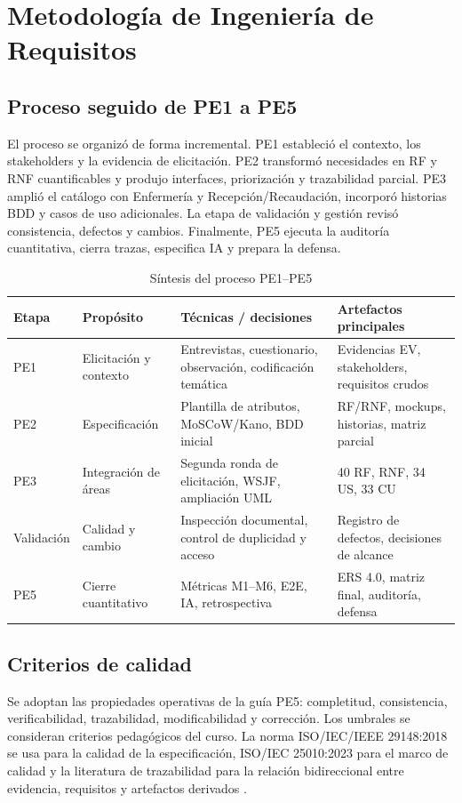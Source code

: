 \documentclass[11pt,a4paper]{article}
\begin{document}
	\section{Metodología de Ingeniería de Requisitos}
	\subsection{Proceso seguido de PE1 a PE5}
	El proceso se organizó de forma incremental. PE1 estableció el contexto, los stakeholders y la evidencia de elicitación. PE2 transformó necesidades en RF y RNF cuantificables y produjo interfaces, priorización y trazabilidad parcial. PE3 amplió el catálogo con Enfermería y Recepción/Recaudación, incorporó historias BDD y casos de uso adicionales. La etapa de validación y gestión revisó consistencia, defectos y cambios. Finalmente, PE5 ejecuta la auditoría cuantitativa, cierra trazas, especifica IA y prepara la defensa.
	
	\begin{table}[H]\centering\caption{Síntesis del proceso PE1--PE5}\label{tab:proceso}
		\begin{tabularx}{\textwidth}{p{1.2cm}p{3cm}Y Y}\toprule
			\textbf{Etapa}&\textbf{Propósito}&\textbf{Técnicas / decisiones}&\textbf{Artefactos principales}\\\midrule
			PE1&Elicitación y contexto&Entrevistas, cuestionario, observación, codificación temática&Evidencias EV, stakeholders, requisitos crudos\\
			PE2&Especificación&Plantilla de atributos, MoSCoW/Kano, BDD inicial&RF/RNF, mockups, historias, matriz parcial\\
			PE3&Integración de áreas&Segunda ronda de elicitación, WSJF, ampliación UML&40 RF, RNF, 34 US, 33 CU\\
			Validación&Calidad y cambio&Inspección documental, control de duplicidad y acceso&Registro de defectos, decisiones de alcance\\
			PE5&Cierre cuantitativo&Métricas M1--M6, E2E, IA, retrospectiva&ERS 4.0, matriz final, auditoría, defensa\\\bottomrule
	\end{tabularx}\end{table}
	
	\subsection{Criterios de calidad}
	Se adoptan las propiedades operativas de la guía PE5: completitud, consistencia, verificabilidad, trazabilidad, modificabilidad y corrección. Los umbrales se consideran criterios pedagógicos del curso. La norma ISO/IEC/IEEE 29148:2018 se usa para la calidad de la especificación, ISO/IEC 25010:2023 para el marco de calidad y la literatura de trazabilidad para la relación bidireccional entre evidencia, requisitos y artefactos derivados \cite{iso29148,iso25010,gotel1994,ramesh2001}.
	
\end{document}
